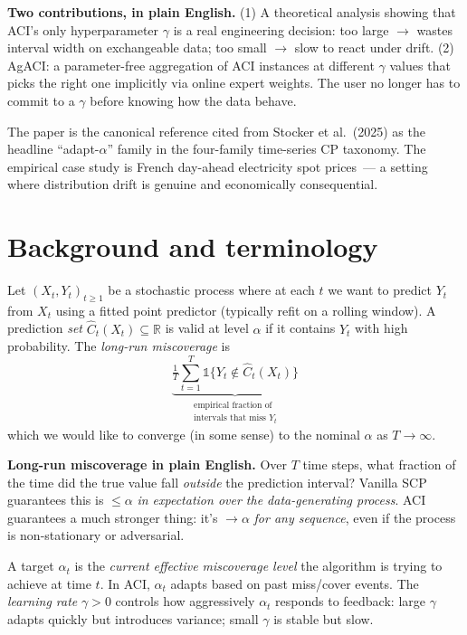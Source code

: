 \documentclass[letterpaper,11pt,leqno]{article}
\begin{document}
\begin{explain}
\textbf{Two contributions, in plain English.} (1) A theoretical analysis showing that ACI's only hyperparameter $\gamma$ is a real engineering decision: too large $\to$ wastes interval width on exchangeable data; too small $\to$ slow to react under drift. (2) AgACI: a parameter-free aggregation of ACI instances at different $\gamma$ values that picks the right one implicitly via online expert weights. The user no longer has to commit to a $\gamma$ before knowing how the data behave.
\end{explain}

The paper is the canonical reference cited from Stocker et al.\ (2025) as the headline ``adapt-$\alpha$'' family in the four-family time-series CP taxonomy. The empirical case study is French day-ahead electricity spot prices~--- a setting where distribution drift is genuine and economically consequential.

\section{Background and terminology}\label{s:background}

Let $(X_t, Y_t)_{t \geq 1}$ be a stochastic process where at each $t$ we want to predict $Y_t$ from $X_t$ using a fitted point predictor (typically refit on a rolling window). A prediction \emph{set} $\hat{C}_t(X_t) \subseteq \mathbb{R}$ is valid at level $\alpha$ if it contains $Y_t$ with high probability. The \emph{long-run miscoverage} is
\begin{equation*}
\underbrace{\tfrac{1}{T} \sum_{t=1}^{T} \mathbb{1}\{Y_t \notin \hat{C}_t(X_t)\}}_{\substack{\text{empirical fraction of}\\\text{intervals that miss }Y_t}}
\end{equation*}
which we would like to converge (in some sense) to the nominal $\alpha$ as $T \to \infty$.

\begin{definitionexplain}
\textbf{Long-run miscoverage in plain English.} Over $T$ time steps, what fraction of the time did the true value fall \emph{outside} the prediction interval? Vanilla SCP guarantees this is $\leq \alpha$ \emph{in expectation over the data-generating process}. ACI guarantees a much stronger thing: it's $\to \alpha$ \emph{for any sequence}, even if the process is non-stationary or adversarial.
\end{definitionexplain}

A target $\alpha_t$ is the \emph{current effective miscoverage level} the algorithm is trying to achieve at time $t$. In ACI, $\alpha_t$ adapts based on past miss/cover events. The \emph{learning rate} $\gamma > 0$ controls how aggressively $\alpha_t$ responds to feedback: large $\gamma$ adapts quickly but introduces variance; small $\gamma$ is stable but slow.
\end{document}
